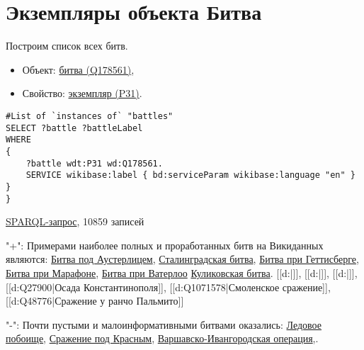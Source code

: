 \section{Экземпляры объекта Битва}

Построим список всех битв.

\begin{itemize}
    \item Объект: \href{https://www.wikidata.org/wiki/Q178561}{битва (Q178561)},
    \item Свойство: \href{https://www.wikidata.org/wiki/Property:P31}{экземпляр (P31)}.
\end{itemize}

\begin{lstlisting}[language=SPARQL]
#List of `instances of` "battles" 
SELECT ?battle ?battleLabel
WHERE
{
    ?battle wdt:P31 wd:Q178561.
    SERVICE wikibase:label { bd:serviceParam wikibase:language "en" }
}
}

\end{lstlisting}

\href{https://query.wikidata.org/#%23added%202017-02%0A%23List%20of%20%60instances%20of%60%20%22national%20park%22%20%0ASELECT%20%3Fbattle%20%3FbattleLabel%0AWHERE%0A%7B%0A%20%20%20%20%3Fbattle%20wdt%3AP31%20wd%3AQ178561.%0A%20%20%20%20SERVICE%20wikibase%3Alabel%20%7B%20bd%3AserviceParam%20wikibase%3Alanguage%20%22en%22%20%7D%0A%7D}{SPARQL-запрос}, 10859 записей

"+": Примерами наиболее полных и проработанных битв на Викиданных являются:
\href{https://www.wikidata.org/wiki/Q134114}{Битва под Аустерлицем}, 
\href{https://www.wikidata.org/wiki/Q38789}{Сталинградская битва},
\href{https://www.wikidata.org/wiki/Q33132}{Битва при Геттисберге},
\href{https://www.wikidata.org/wiki/Q31900}{Битва при Марафоне},
\href{https://www.wikidata.org/wiki/Q48314}{Битва при Ватерлоо}
\href{https://www.wikidata.org/wiki/Q210354}{Куликовская битва}.
[[d:|]], [[d:|]], [[d:|]], [[d:Q27900|Осада Константинополя]],  [[d:Q1071578|Смоленское сражение]], [[d:Q48776|Сражение у ранчо Пальмито]]

"-": Почти пустыми и малоинформативными битвами оказались:
\href{https://www.wikidata.org/wiki/Q14689}{Ледовое побоище},
\href{https://www.wikidata.org/wiki/Q25809}{Сражение под Красным},
\href{https://www.wikidata.org/wiki/Q28205}{Варшавско-Ивангородская операция},.